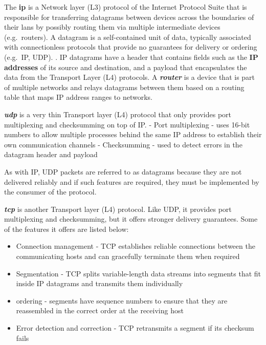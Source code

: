 The \textbf{\acrfull{ip}} \autocite{ipv4RFC} is a Network layer (L3)
protocol of the Internet Protocol Suite that is responsible for
transferring datagrams between devices across the boundaries of their
\glspl{lan} by possibly routing them via multiple intermediate devices
(e.g.~routers). A datagram is a self-contained unit of data, typically
associated with connectionless protocols that provide no guarantees for
delivery or ordering (e.g.~IP, UDP).
. IP datagrams
have a header that contains fields such as the \textbf{IP addresses} of
its source and destination, and a
payload that encapsulates the data from the Transport Layer (L4)
protocols. A \textbf{\emph{router}} is a device that is part of multiple
networks and relays datagrams between them based on a routing table that
maps IP address ranges to networks.

\textbf{\emph{\acrfull{udp}}} is a very thin Transport layer (L4)
protocol that only provides port multiplexing and checksumming on top of
IP. - Port multiplexing - uses 16-bit numbers to allow multiple
processes behind the same IP address to establish their own
communication channels - Checksumming - used to detect errors in the
datagram header and payload

As with IP, UDP packets are referred to as datagrams because they are
not delivered reliably and if such features are required, they must be
implemented by the consumer of the protocol.

\textbf{\emph{\acrfull{tcp}}} is another Transport layer (L4) protocol.
Like UDP, it provides port multiplexing and checksumming, but it offers
stronger delivery guarantees. Some of the features it offers are listed
below:

\begin{itemize}
\tightlist
\item
  Connection management - TCP establishes reliable connections between
  the communicating hosts and can gracefully terminate them when
  required
\item
  Segmentation - TCP splits variable-length data streams into segments
  that fit inside IP datagrams and transmits them individually
\item
  ordering - segments have sequence numbers to ensure that they are
  reassembled in the correct order at the receiving host
\item
  Error detection and correction - TCP retransmits a segment if its
  checksum fails
\end{itemize}

